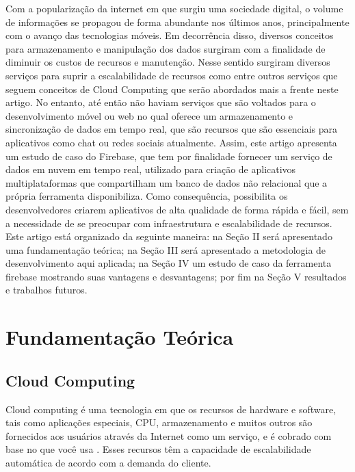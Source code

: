 \documentclass[12pt]{article}
\begin{document}
Com a popularização da internet em que surgiu uma sociedade digital, o volume de informações se propagou de forma abundante nos últimos anos, principalmente com o avanço das tecnologias móveis. Em decorrência disso, diversos conceitos para armazenamento e manipulação dos dados surgiram com a finalidade de diminuir os custos de recursos e manutenção. Nesse sentido surgiram diversos serviços para suprir a escalabilidade de recursos como \cite{WA} \cite{GAE} \cite{AWS} entre outros serviços que seguem conceitos de Cloud Computing que serão abordados mais a frente neste artigo. No entanto, até então não haviam serviços que são voltados para o desenvolvimento móvel ou web no qual oferece um armazenamento e sincronização de dados em tempo real, que são recursos que são essenciais para aplicativos como chat ou redes sociais atualmente. Assim, este artigo apresenta um estudo de caso do Firebase, que tem por finalidade fornecer um serviço de dados em nuvem em tempo real, utilizado para criação de aplicativos multiplataformas que compartilham um banco de dados não relacional que a própria ferramenta disponibiliza. Como consequência, possibilita os desenvolvedores criarem aplicativos de alta qualidade de forma rápida e fácil, sem a necessidade de se preocupar com infraestrutura e escalabilidade de recursos.
\\
Este artigo está organizado da seguinte maneira: na Seção II será apresentado uma fundamentação teórica; na Seção III será apresentado a metodologia de desenvolvimento aqui aplicada; na Seção IV um estudo de caso da ferramenta firebase mostrando suas vantagens e desvantagens; por fim na Seção V resultados e trabalhos futuros.

\section{Fundamentação Teórica} \label{sec:firstpage}

\subsection{Cloud Computing}

Cloud computing é uma tecnologia em que os recursos de hardware e software, tais como aplicações especiais, CPU, armazenamento e muitos outros são fornecidos aos usuários através da Internet como um serviço, e é cobrado com base no que você usa \cite{1}. Esses recursos têm a capacidade de escalabilidade automática de acordo com a demanda do cliente.
\end{document}
